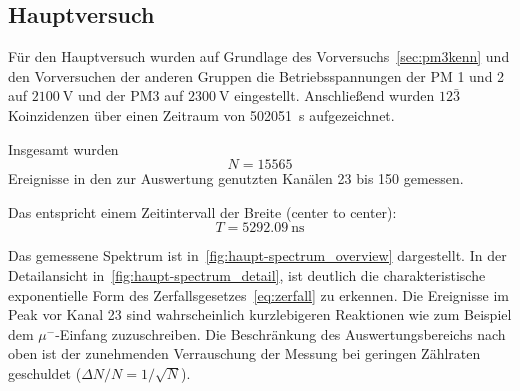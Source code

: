 \documentclass[slug=LM, room=Andreas-Schubert-Bau\,\ K\ 1A, supervisor=Anne-Sophie\ Berthold, coursedate=13.\ 12.\ 2019]{../../Lab_Report_LaTeX/lab_report}
\begin{document}
%
%

\subsection{Hauptversuch}
\label{sec:hauptversuch}

F\"ur den Hauptversuch wurden auf Grundlage des
Vorversuchs~\ref{sec:pm3kenn} und den Vorversuchen der anderen Gruppen
die Betriebsspannungen der PM 1 und 2 auf \(\SI{2100}{\volt}\) und der
PM3 auf \(\SI{2300}{\volt}\) eingestellt. Anschließend wurden
\(\textit{12}\bar{\textit{3}}\) Koinzidenzen \"uber einen Zeitraum von
\SI{502051}{\second} aufgezeichnet.

Insgesamt wurden
\begin{equation}
  \label{eq:totalcount}
  N=15565
\end{equation}
Ereignisse in den zur Auswertung genutzten Kan\"alen 23 bis 150
gemessen.

Das entspricht einem Zeitintervall der Breite (center to center):
\begin{equation}
  \label{eq:totalwidth}
  T = \SI{5292.09}{\nano\second}
\end{equation}

Das gemessene Spektrum ist
in~\ref{fig:haupt-spectrum_overview} dargestellt. In der
Detailansicht in~\ref{fig:haupt-spectrum_detail}, ist deutlich die
charakteristische exponentielle Form des
Zerfallsgesetzes~\ref{eq:zerfall} zu erkennen.
Die Ereignisse im Peak vor Kanal 23 sind wahrscheinlich kurzlebigeren
Reaktionen wie zum Beispiel dem \(\mu^{-}\)-Einfang zuzuschreiben. Die
Beschr\"ankung des Auswertungsbereichs nach oben ist der zunehmenden
Verrauschung der Messung bei geringen Z\"ahlraten geschuldet (\(\Delta
N/N=1/\sqrt{N}\)).
\end{document}
